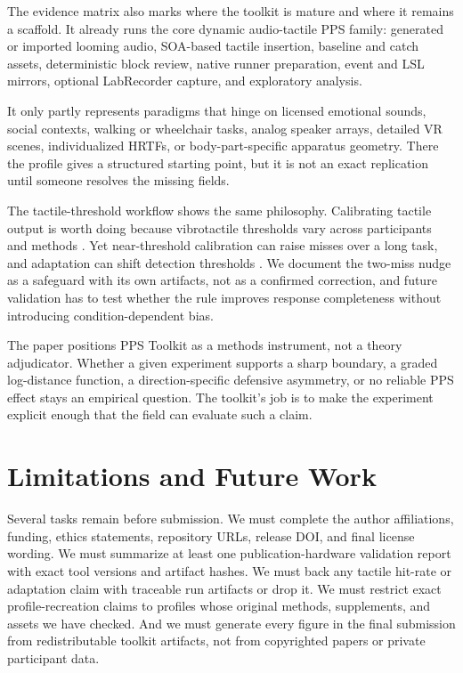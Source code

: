 \documentclass[pdflatex,sn-apa]{sn-jnl}
\newcommand{\toolkit}{PPS Toolkit}
\begin{document}
The evidence matrix also marks where the toolkit is mature and where it remains a scaffold. It already runs the core dynamic audio-tactile PPS family: generated or imported looming audio, SOA-based tactile insertion, baseline and catch assets, deterministic block review, native runner preparation, event and LSL mirrors, optional LabRecorder capture, and exploratory analysis.

It only partly represents paradigms that hinge on licensed emotional sounds, social contexts, walking or wheelchair tasks, analog speaker arrays, detailed VR scenes, individualized HRTFs, or body-part-specific apparatus geometry. There the profile gives a structured starting point, but it is not an exact replication until someone resolves the missing fields.

The tactile-threshold workflow shows the same philosophy. Calibrating tactile output is worth doing because vibrotactile thresholds vary across participants and methods \citep{Merchel2020,Mikkelsen2020,Pate2024}. Yet near-threshold calibration can raise misses over a long task, and adaptation can shift detection thresholds \citep{Goble1993,Hollins1990}. We document the two-miss nudge as a safeguard with its own artifacts, not as a confirmed correction, and future validation has to test whether the rule improves response completeness without introducing condition-dependent bias.

The paper positions \toolkit{} as a methods instrument, not a theory adjudicator. Whether a given experiment supports a sharp boundary, a graded log-distance function, a direction-specific defensive asymmetry, or no reliable PPS effect stays an empirical question. The toolkit's job is to make the experiment explicit enough that the field can evaluate such a claim.

\section{Limitations and Future Work}

Several tasks remain before submission. We must complete the author affiliations, funding, ethics statements, repository URLs, release DOI, and final license wording. We must summarize at least one publication-hardware validation report with exact tool versions and artifact hashes. We must back any tactile hit-rate or adaptation claim with traceable run artifacts or drop it. We must restrict exact profile-recreation claims to profiles whose original methods, supplements, and assets we have checked. And we must generate every figure in the final submission from redistributable toolkit artifacts, not from copyrighted papers or private participant data.
\end{document}
